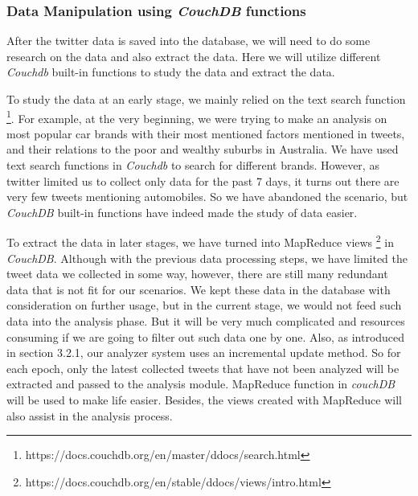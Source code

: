 \documentclass{article}
\begin{document}
\subsubsection{Data Manipulation using \textit{CouchDB} functions}
After the twitter data is saved into the database, we will need to do some research on the data and also extract the data. Here we will utilize different \textit{Couchdb} built-in functions to study the data and extract the data.

To study the data at an early stage, we mainly relied on the text search function \footnote{https://docs.couchdb.org/en/master/ddocs/search.html}. For example, at the very beginning, we were trying to make an analysis on most popular car brands with their most mentioned factors mentioned in tweets, and their relations to the poor and wealthy suburbs in Australia. We have used text search functions in \textit{Couchdb} to search for different brands. However, as twitter limited us to collect only data for the past 7 days, it turns out there are very few tweets mentioning automobiles. So we have abandoned the scenario, but \textit{CouchDB} built-in functions have indeed made the study of data easier.

To extract the data in later stages, we have turned into MapReduce views \footnote{https://docs.couchdb.org/en/stable/ddocs/views/intro.html} in \textit{CouchDB}. Although with the previous data processing steps, we have limited the tweet data we collected in some way, however, there are still many redundant data that is not fit for our scenarios. We kept these data in the database with consideration on further usage, but in the current stage, we would not feed such data into the analysis phase. But it will be very much complicated and resources consuming if we are going to filter out such data one by one. Also, as introduced in section 3.2.1, our analyzer system uses an incremental update method. So for each epoch, only the latest collected tweets that have not been analyzed will be extracted and passed to the analysis module. MapReduce function in \textit{couchDB} will be used to make life easier. Besides, the views created with MapReduce will also assist in the analysis process.
\end{document}
